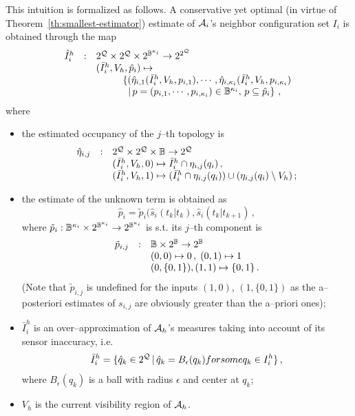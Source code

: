 \documentclass[journal, onecolumn, 12pt]{styles/IEEEtran}
\begin{document}
This intuition is formalized as follows. A conservative yet optimal (in virtue of Theorem~\ref{th:smallest-estimator}) estimate of $\mathcal{A}_i$'s neighbor configuration set $I_i$ is obtained through the map
$$
\begin{array}{rcl}
\hat{I}_i^h & : & 2^{\mathcal{Q}} \times 2^{\mathcal{Q}} \times 2^{\Bbb{B}^{\kappa_i}} \rightarrow  2^{2^{\mathcal{Q}}} \\
& & (\bar{I}_i^h, V_h, \hat{p}_i) \mapsto \\
& & \;\;\;\;\;\;\;\;\;\; \{ (\hat{\eta}_{i,1}(\bar{I}_i^h, V_h, p_{i,1}) , \cdots, \hat{\eta}_{i,\kappa_i}(\bar{I}_i^h, V_h, p_{i,\kappa_i}) \, \\
& & \;\;\;\;\;\;\;\;\;\;\;\; | \, p = (p_{i,1}, \cdots, p_{i,\kappa_i}) \in \Bbb{B}^{\kappa_i}, \, p \subseteq \hat{p}_i \} \, 
\, , 
\end{array}
$$
where
\begin{itemize}
%
\item
the estimated occupancy of the $j$--th topology is  
$$
\begin{array}{rcl}
\hat{\eta}_{i,j} & : & 2^{\mathcal{Q}} \times 2^{\mathcal{Q}} \times \Bbb{B} \rightarrow  2^{\mathcal{Q}} \\
& & (\bar{I}_i^h, V_h, 0) \mapsto \bar{I}_i^h \cap \eta_{i,j}(q_i) \, , \\
& & (\bar{I}_i^h, V_h, 1) \mapsto (\bar{I}_i^h \cap \eta_{i,j}(q_i)) \cup (\eta_{i,j}(q_i) \setminus V_h) \, ;
\end{array}
$$
%
\item
the estimate of the unknown term is obtained as 
$$
\hat{p}_i = \tilde{p}_i(\hat{s}_i(t_k|t_k), \hat{s}_i(t_k|t_{k+1}) \, , 
$$
where $\tilde{p}_i : \Bbb{B}^{\kappa_i} \times
2^{\Bbb{B}^{\kappa_i}} \rightarrow 2^{\Bbb{B}^{\kappa_i}}$ is s.t. its $j$--th component is
$$
\begin{array}{rcl}
\tilde{p}_{i,j} & : & \Bbb{B} \times 2^\Bbb{B} \rightarrow 2^{\Bbb{B}}  \\
& & (0, 0) \mapsto 0 \, , \; (0, 1) \mapsto 1 \, \\
& & (0, \{0,1\}), (1, 1) \mapsto \{0, 1\} \, .
\end{array}
$$
(Note that $\tilde{p}_{i,j}$ is undefined for the inputs $(1,0)$, $(1, \{0, 1\})$ as the a--posteriori estimates of $s_{i,j}$ are obviously greater than the a--priori ones);
%
%
\item $\bar{I}_i^h$ is an over--approximation of $\mathcal{A}_h$'s measures taking into account of its sensor inaccuracy, i.e. 
$$
\bar{I}_i^h = \{ \hat{q}_k \in 2^{\mathcal{Q}}\, | \, \hat{q}_k = B_\epsilon(q_k) \relax{ for some } q_k \in I_i^h \} \, ,
$$
where $B_\epsilon(q_k)$ is a ball with radius $\epsilon$ and center at $q_k$;
%
\item $V_h$ is the current visibility region of $\mathcal{A}_h$.
%
\end{itemize}
\end{document}
